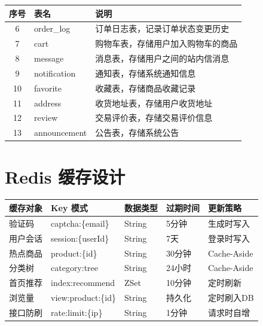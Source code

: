 \documentclass[12pt,a4paper,UTF8]{ctexart}
\begin{document}
\begin{longtable}{|c|p{}|p{}|}
    \toprule
    \textbf{序号} & \textbf{表名} & \textbf{说明} \\
    \midrule
    \endhead
    \bottomrule
    \endfoot

    6 & order\_log & 订单日志表，记录订单状态变更历史 \\
    7 & cart & 购物车表，存储用户加入购物车的商品 \\
    8 & message & 消息表，存储用户之间的站内信消息 \\
    9 & notification & 通知表，存储系统通知信息 \\
    10 & favorite & 收藏表，存储商品收藏记录 \\
    11 & address & 收货地址表，存储用户收货地址 \\
    12 & review & 交易评价表，存储交易评价信息 \\
    13 & announcement & 公告表，存储系统公告 \\
\end{longtable}

\section{Redis 缓存设计}

\begin{longtable}{p{}|p{}|p{}|p{}|p{}}
    \toprule
    \textbf{缓存对象} & \textbf{Key 模式} & \textbf{数据类型} & \textbf{过期时间} & \textbf{更新策略} \\
    \midrule
    \endhead
    \bottomrule
    \endfoot

    验证码 & captcha:\{email\} & String & 5分钟 & 生成时写入 \\
    用户会话 & session:\{userId\} & String & 7天 & 登录时写入 \\
    热点商品 & product:\{id\} & String & 30分钟 & Cache-Aside \\
    分类树 & category:tree & String & 24小时 & Cache-Aside \\
    首页推荐 & index:recommend & ZSet & 10分钟 & 定时刷新 \\
    浏览量 & view:product:\{id\} & String & 持久化 & 定时刷入DB \\
    接口防刷 & rate:limit:\{ip\} & String & 1分钟 & 请求时自增 \\
\end{longtable}
\end{document}
